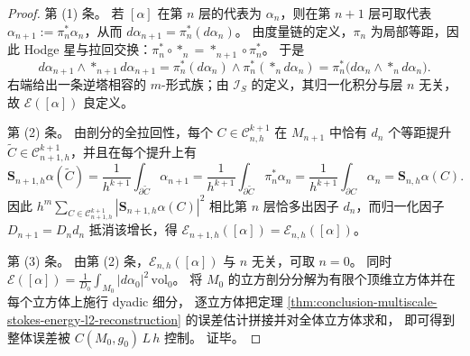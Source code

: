 \begin{proof}
第 (1) 条。
若 \([\alpha]\) 在第 \(n\) 层的代表为 \(\alpha_n\)，则在第 \(n+1\) 层可取代表 \(\alpha_{n+1}:=\pi_n^\ast\alpha_n\)，从而 \(d\alpha_{n+1}=\pi_n^\ast(d\alpha_n)\)。
由度量链的定义，\(\pi_n\) 为局部等距，因此 Hodge 星与拉回交换：\(\pi_n^\ast\circ *_n= *_{n+1}\circ \pi_n^\ast\)。
于是
\[
d\alpha_{n+1}\wedge *_{n+1}d\alpha_{n+1}
=
\pi_n^\ast(d\alpha_n)\wedge \pi_n^\ast(*_n d\alpha_n)
=
\pi_n^\ast\bigl(d\alpha_n\wedge *_n d\alpha_n\bigr).
\]
右端给出一条逆塔相容的 \(m\)-形式族；由 \(\mathcal I_S\) 的定义，其归一化积分与层 \(n\) 无关，故 \(\mathcal E([\alpha])\) 良定义。
\par
第 (2) 条。
由剖分的全拉回性，每个 \(C\in\mathcal C_{n,h}^{k+1}\) 在 \(M_{n+1}\) 中恰有 \(d_n\) 个等距提升 \(\widetilde C\in\mathcal C_{n+1,h}^{k+1}\)，并且在每个提升上有
\[
\mathbf S_{n+1,h}\alpha(\widetilde C)
=
\frac{1}{h^{k+1}}\int_{\partial \widetilde C}\alpha_{n+1}
=
\frac{1}{h^{k+1}}\int_{\partial \widetilde C}\pi_n^\ast\alpha_n
=
\frac{1}{h^{k+1}}\int_{\partial C}\alpha_n
=
\mathbf S_{n,h}\alpha(C).
\]
因此 \(h^{m}\sum_{C\in\mathcal C_{n+1,h}^{k+1}}|\mathbf S_{n+1,h}\alpha(C)|^2\) 相比第 \(n\) 层恰多出因子 \(d_n\)，而归一化因子 \(D_{n+1}=D_n d_n\) 抵消该增长，得 \(\mathcal E_{n+1,h}([\alpha])=\mathcal E_{n,h}([\alpha])\)。
\par
第 (3) 条。
由第 (2) 条，\(\mathcal E_{n,h}([\alpha])\) 与 \(n\) 无关，可取 \(n=0\)。
同时 \(\mathcal E([\alpha])=\frac{1}{D_0}\int_{M_0}|d\alpha_0|^2\,\mathrm{vol}_0\)。
将 \(M_0\) 的立方剖分分解为有限个顶维立方体并在每个立方体上施行 dyadic 细分，
逐立方体把定理 \ref{thm:conclusion-multiscale-stokes-energy-l2-reconstruction} 的误差估计拼接并对全体立方体求和，
即可得到整体误差被 \(C(M_0,g_0)\,L\,h\) 控制。
证毕。
\end{proof}

\endinput
